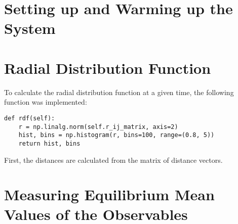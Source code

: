 \documentclass[a4paper,10pt,bibtotoc]{scrartcl}
\begin{document}
\section{Setting up and Warming up the System}
\section{Radial Distribution Function}
To calculate the radial distribution function at a given time, the following function was implemented:
\begin{lstlisting}
def rdf(self):
    r = np.linalg.norm(self.r_ij_matrix, axis=2)
    hist, bins = np.histogram(r, bins=100, range=(0.8, 5))
    return hist, bins
\end{lstlisting}
First, the distances are calculated from the matrix of distance vectors. 


\section{Measuring Equilibrium Mean Values of the Observables}
\end{document}
